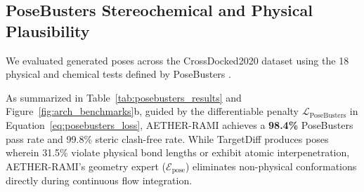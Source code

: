 \subsection{PoseBusters Stereochemical and Physical Plausibility}
We evaluated generated poses across the CrossDocked2020 dataset using the 18 physical and chemical tests defined by PoseBusters \cite{van2023posebusters}.

\begin{table}[h]
\caption{CrossDocked2020 and PoseBusters Benchmark Comparison}
\label{tab:posebusters_results}
\centering
\small
{}
\end{table}

As summarized in Table~\ref{tab:posebusters_results} and Figure~\ref{fig:arch_benchmarks}b, guided by the differentiable penalty $\mathcal{L}_{\text{PoseBusters}}$ in Equation~\eqref{eq:posebusters_loss}, AETHER-RAMI achieves a \textbf{98.4\%} PoseBusters pass rate and 99.8\% steric clash-free rate. While TargetDiff produces poses wherein 31.5\% violate physical bond lengths or exhibit atomic interpenetration, AETHER-RAMI's geometry expert ($\mathcal{E}_{\text{pose}}$) eliminates non-physical conformations directly during continuous flow integration.

